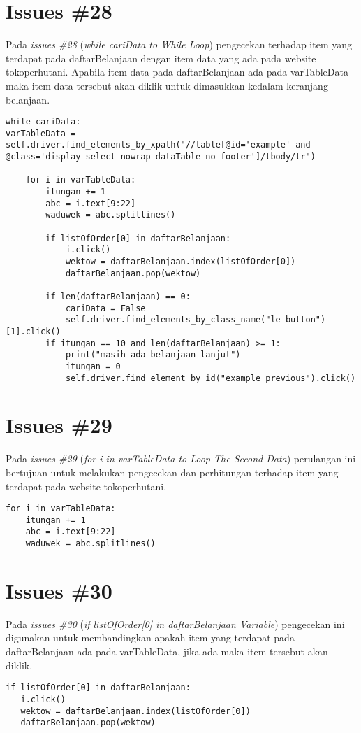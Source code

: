 \section{Issues \#28}
Pada \textit{issues \#28} (\textit{while cariData to While Loop}) pengecekan terhadap item yang terdapat pada daftarBelanjaan dengan item data yang ada pada website tokoperhutani. Apabila item data pada daftarBelanjaan ada pada varTableData maka item data tersebut akan diklik untuk dimasukkan kedalam keranjang belanjaan.
\begin{verbatim}
while cariData:
varTableData = self.driver.find_elements_by_xpath("//table[@id='example' and @class='display select nowrap dataTable no-footer']/tbody/tr")

	for i in varTableData:
   		itungan += 1
   		abc = i.text[9:22]
   		waduwek = abc.splitlines()

   		if listOfOrder[0] in daftarBelanjaan:
       		i.click()
      		wektow = daftarBelanjaan.index(listOfOrder[0])
       		daftarBelanjaan.pop(wektow)

        if len(daftarBelanjaan) == 0:
            cariData = False
            self.driver.find_elements_by_class_name("le-button")[1].click()
        if itungan == 10 and len(daftarBelanjaan) >= 1:
            print("masih ada belanjaan lanjut")
            itungan = 0
            self.driver.find_element_by_id("example_previous").click()
\end{verbatim}

\section{Issues \#29}
Pada \textit{issues \#29} (\textit{for i in varTableData to Loop The Second Data}) perulangan ini bertujuan untuk melakukan pengecekan dan perhitungan terhadap item yang terdapat pada website tokoperhutani.
\begin{verbatim}
for i in varTableData:
   	itungan += 1
   	abc = i.text[9:22]
   	waduwek = abc.splitlines()
\end{verbatim}


\section{Issues \#30}
Pada \textit{issues \#30} (\textit{if listOfOrder[0] in daftarBelanjaan Variable}) pengecekan ini digunakan untuk membandingkan apakah item yang terdapat pada daftarBelanjaan ada pada varTableData, jika ada maka item tersebut akan diklik.
\begin{verbatim}
if listOfOrder[0] in daftarBelanjaan:
   i.click()
   wektow = daftarBelanjaan.index(listOfOrder[0])
   daftarBelanjaan.pop(wektow)
\end{verbatim}